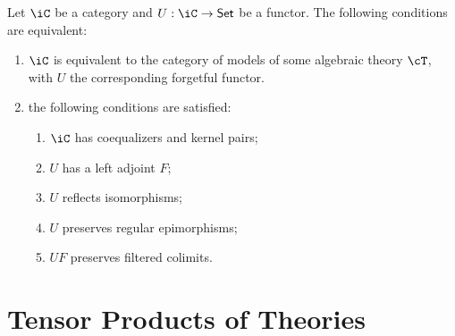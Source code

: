 \documentclass{amsart}
\begin{document}
\begin{thm}
  Let $\iC$ be a category and $U : \iC \to \mathsf{Set}$ be a functor.
  The following conditions are equivalent:
  \begin{enumerate}
  \item $\iC$ is equivalent to the category of models of some algebraic theory $\cT$, with $U$ the corresponding forgetful functor.
  \item the following conditions are satisfied:
    \begin{enumerate}
    \item $\iC$ has coequalizers and kernel pairs;
    \item $U$ has a left adjoint $F$;
    \item $U$ reflects isomorphisms;
    \item $U$ preserves regular epimorphisms;
    \item $UF$ preserves filtered colimits.
    \end{enumerate}
  \end{enumerate}
\end{thm}

\section{Tensor Products of Theories}
\label{sec:tensor-products-of-theories}





\end{document}
